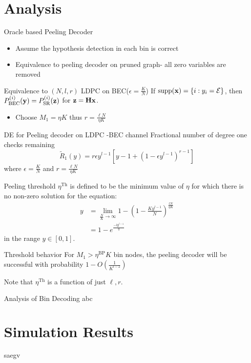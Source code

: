 \documentclass[10pt]{beamer}
\begin{document}
\section{Analysis}
\begin{frame}{Oracle based Peeling Decoder}
\begin{itemize}
\item Assume the hypothesis detection in each bin is correct
\item Equivalence to peeling decoder on pruned graph- all zero variables are removed
\end{itemize}
\begin{block}{Equivalence to $(N,l,r)$ LDPC on BEC($\epsilon=\frac{K}{N}$)}
If $\text{supp}(\mathbf{x})=\{i:y_i=\mathcal{E}\}$, then $P^{(i)}_{\text{BEC}}(\mathbf{y})=P^{(i)}_{\text{SR}}(\mathbf{z})$  for $\mathbf{z=Hx}$.
\end{block}
\begin{itemize}
\item Choose $M_1=\eta K$ thus $r=\frac{\ell N}{\eta K}$
\end{itemize}
\vspace{1ex}
\begin{block}{DE for Peeling decoder on LDPC -BEC channel}
Fractional number of degree one checks remaining
\begin{equation*}
\tilde{R}_1(y)=r\epsilon y^{l-1}[y-1+(1-\epsilon y^{l-1})^{r-1}]
\end{equation*}
where $\epsilon=\frac{K}{N}$ and $r=\frac{\ell N}{\eta K}$
\end{block}
\end{frame}

\begin{frame}
\begin{block}{Peeling threshold}
$\eta^{\text{Th}}$ is defined to be the minimum value of $\eta$ for which there is no non-zero solution for the equation:
\begin{align*}
y&=\lim_{\frac{N}{K}\rightarrow\infty}1-\left(1-\frac{Ky^{l-1}}{N}\right)^{\frac{lN}{\eta K}}\\
  &=1-e^{\frac{-ly^{l-1}}{\eta}}
\end{align*}
in the range $y\in [0,1]$.
\end{block}
\vspace{3ex}
\begin{block}{Threshold behavior}
For $M_1>\eta^{\text{BP}}K$ bin nodes, the peeling decoder will be successful with probability $1-O\left(\frac{1}{K^{l-2}}\right)$
\end{block}
Note that $\eta^{\text{Th}}$ is a function of just $\ell,r$.
\end{frame}

\begin{frame}{Analysis of Bin Decoding}
abc
\end{frame}

\section{Simulation Results}
\begin{frame}
saegv
\end{frame}
\end{document}

